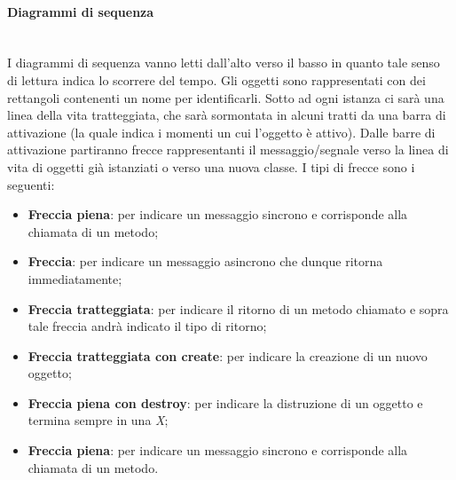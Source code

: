 \paragraph{Diagrammi di sequenza}\mbox{}\\[0.4cm]
I diagrammi di sequenza vanno letti dall'alto verso il basso in quanto tale senso di lettura indica lo scorrere del tempo. Gli oggetti sono rappresentati con dei rettangoli contenenti un nome per identificarli. Sotto ad ogni istanza ci sarà una linea della vita tratteggiata, che sarà sormontata in alcuni tratti da una barra di attivazione (la quale indica i momenti un cui l'oggetto è attivo). Dalle barre di attivazione partiranno frecce rappresentanti il messaggio/segnale verso la linea di vita di oggetti già istanziati o verso una nuova classe. I tipi di frecce sono i seguenti:
\begin{itemize}
    \item \textbf{Freccia piena}: per indicare un messaggio sincrono e corrisponde alla chiamata di un metodo;
    \item \textbf{Freccia}: per indicare un messaggio asincrono che dunque ritorna immediatamente;
    \item \textbf{Freccia tratteggiata}: per indicare il ritorno di un metodo chiamato e sopra tale freccia andrà indicato il tipo di ritorno;
    \item \textbf{Freccia tratteggiata con create}: per indicare la creazione di un nuovo oggetto;
    \item \textbf{Freccia piena con destroy}: per indicare la distruzione di un oggetto e termina sempre in una \textit{X};
    \item \textbf{Freccia piena}: per indicare un messaggio sincrono e corrisponde alla chiamata di un metodo.
\end{itemize}
